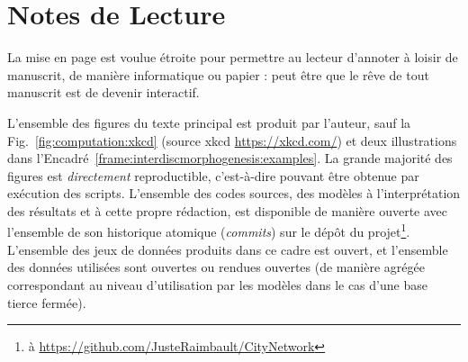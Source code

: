 



\begingroup
\let\clearpage\relax
\let\cleardoublepage\relax
\let\cleardoublepage\relax


\chapter*{Notes de Lecture}




La mise en page est voulue étroite pour permettre au lecteur d'annoter à loisir de manuscrit, de manière informatique ou papier : peut être que le rêve de tout manuscrit est de devenir interactif.

L'ensemble des figures du texte principal est produit par l'auteur, sauf la Fig.~\ref{fig:computation:xkcd} (source xkcd \url{https://xkcd.com/}) et deux illustrations dans l'Encadré~\ref{frame:interdiscmorphogenesis:examples}. La grande majorité des figures est \emph{directement} reproductible, c'est-à-dire pouvant être obtenue par exécution des scripts. L'ensemble des codes sources, des modèles à l'interprétation des résultats et à cette propre rédaction, est disponible de manière ouverte avec l'ensemble de son historique atomique (\emph{commits}) sur le dépôt du projet\footnote{à \url{https://github.com/JusteRaimbault/CityNetwork}}. L'ensemble des jeux de données produits dans ce cadre est ouvert, et l'ensemble des données utilisées sont ouvertes ou rendues ouvertes (de manière agrégée correspondant au niveau d'utilisation par les modèles dans le cas d'une base tierce fermée).

